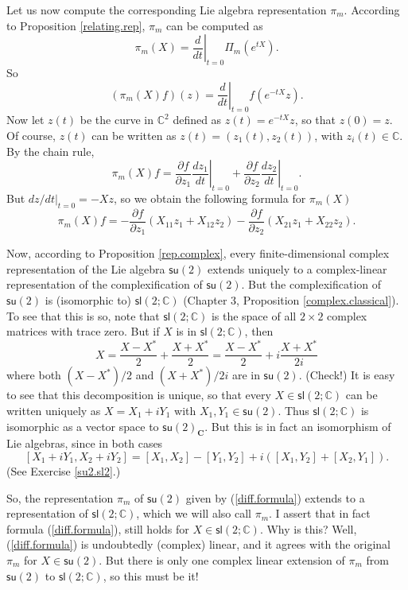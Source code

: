 \documentclass{amsbook}
\theoremstyle{plain}
\numberwithin{equation}{chapter}
\numberwithin{theorem}{chapter}
\begin{document}
Let us now compute the corresponding Lie algebra representation $\pi_{m}$.
According to Proposition \ref{relating.rep}, $\pi_{m}$ can be computed as
\[
\pi_{m}(X)=\left.  \frac d{dt}\right|  _{t=0}\Pi_{m}\left(  e^{tX}\right)
\text{.}%
\]
So
\[
\left(  \pi_{m}(X)f\right)  (z)=\left.  \frac d{dt}\right|  _{t=0}f\left(
e^{-tX}z\right)  \text{.}%
\]
Now let $z(t)$ be the curve in $\mathbb{C}^{2}$ defined as $z(t)=e^{-tX}z$, so
that $z(0)=z$. Of course, $z(t)$ can be written as $z(t)=(z_{1}(t),z_{2}(t))$,
with $z_{i}(t)\in\mathbb{C}$. By the chain rule,
\[
\pi_{m}(X)f=\frac{\partial f}{\partial z_{1}}\left.  \frac{dz_{1}}{dt}\right|
_{t=0}+\frac{\partial f}{\partial z_{2}}\left.  \frac{dz_{2}}{dt}\right|
_{t=0}\text{.}%
\]
But $\left.  dz/dt\right|  _{t=0}=-Xz$, so we obtain the following formula for
$\pi_{m}(X)$
\begin{equation}
\pi_{m}(X)f=-\frac{\partial f}{\partial z_{1}}\left(  X_{11}z_{1}+X_{12}%
z_{2}\right)  -\frac{\partial f}{\partial z_{2}}\left(  X_{21}z_{1}%
+X_{22}z_{2}\right)  \text{.}\label{diff.formula}%
\end{equation}

Now, according to Proposition \ref{rep.complex}, every finite-dimensional
complex representation of the Lie algebra $\mathsf{su}(2)$ extends uniquely to
a complex-linear representation of the complexification of $\mathsf{su}(2)$.
But the complexification of $\mathsf{su}(2)$ is (isomorphic to) $\mathsf{sl}%
(2;\mathbb{C})$ (Chapter 3, Proposition \ref{complex.classical}). To see that
this is so, note that $\mathsf{sl}(2;\mathbb{C})$ is the space of all
$2\times2$ complex matrices with trace zero. But if $X$ is in $\mathsf{sl}%
(2;\mathbb{C})$, then
\[
X=\frac{X-X^{\ast}}{2}+\frac{X+X^{\ast}}{2}=\frac{X-X^{\ast}}{2}%
+i\frac{X+X^{\ast}}{2i}%
\]
where both $(X-X^{\ast})/2$ and $(X+X^{\ast})/2i$ are in $\mathsf{su}(2)$.
(Check!) It is easy to see that this decomposition is unique, so that every
$X\in\mathsf{sl}(2;\mathbb{C})$ can be written uniquely as $X=X_{1}+iY_{1}$
with $X_{1},Y_{1}\in\mathsf{su}(2)$. Thus $\mathsf{sl}(2;\mathbb{C})$ is
isomorphic as a vector space to $\mathsf{su}(2)_{\mathbf{C}}$. But this is in
fact an isomorphism of Lie algebras, since in both cases
\[
\left[  X_{1}+iY_{1},X_{2}+iY_{2}\right]  =\left[  X_{1},X_{2}\right]
-\left[  Y_{1},Y_{2}\right]  +i\left(  \left[  X_{1},Y_{2}\right]  +\left[
X_{2},Y_{1}\right]  \right)  \text{.}%
\]
(See Exercise \ref{su2.sl2}.)

So, the representation $\pi_{m}$ of $\mathsf{su}(2)$ given by
(\ref{diff.formula}) extends to a representation of $\mathsf{sl}%
(2;\mathbb{C})$, which we will also call $\pi_{m}$. I assert that in fact
formula (\ref{diff.formula}), still holds for $X\in\mathsf{sl}(2;\mathbb{C})$.
Why is this? Well, (\ref{diff.formula}) is undoubtedly (complex) linear, and
it agrees with the original $\pi_{m}$ for $X\in\mathsf{su}(2)$. But there is
only one complex linear extension of $\pi_{m}$ from $\mathsf{su}(2)$ to
$\mathsf{sl}(2;\mathbb{C})$, so this must be it!
\end{document}
